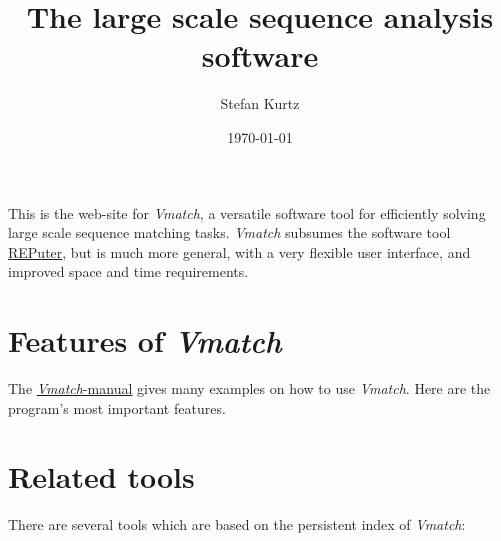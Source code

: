 \documentclass[12pt]{article}
\title{The \Vmatch large scale sequence analysis software}
\author{Stefan Kurtz}
\date{\today}
\newcommand{\Vmatch}[0]{\textit{Vmatch}\xspace}
\newcommand{\HCode}[1]{}
\begin{document}
\maketitle



\HCode{
<!--delete paragraph-->
<br/>
<center>
<img src="matchgraph.gif"
     alt="show matches of different sizes in a matchgraph"/>
</center>
<div id="downloadbox">
<ul>
  <li><a href="download.html">Download <i>Vmatch</i>!</a></li>
</ul>
</div>
}

This is the web-site for \Vmatch,
a versatile software tool for efficiently
solving large scale se\-quence matching tasks.
\Vmatch subsumes the software tool
\href{http://bibiserv.techfak.uni-bielefeld.de/reputer}{REPuter},
but is much more general, with a very flexible user interface,
and improved space and time requirements.
\HCode{
<a href="vmweb.pdf">Here</a> is a printable version of this
HTML-page in PDF.
}

\section*{Features of \Vmatch}
The \href{virtman.pdf}{\Vmatch-manual}
gives many examples on how to use \Vmatch. Here are the program's most
important features.



\HCode{
<a href="Dataflowfig.pdf">Here</a> is an overview of the dataflow
in <i>Vmatch</i>.
}

\section*{Related tools}
There are several tools which are
based on the persistent index of \Vmatch:
\end{document}
